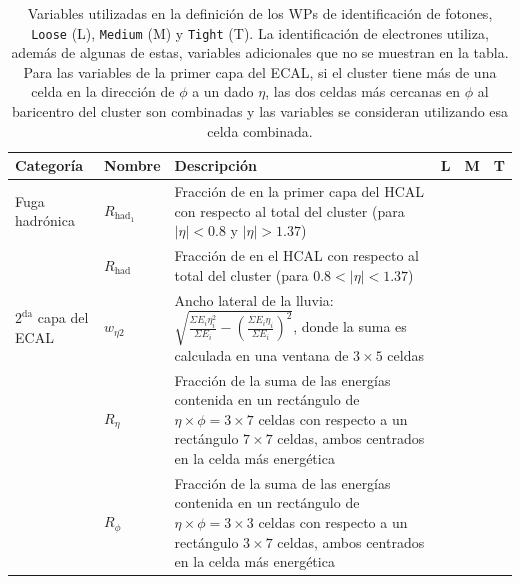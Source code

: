\begin{table}
\centering 
\caption{Variables utilizadas en la definición de los WPs de identificación de fotones, \texttt{Loose} (L), \texttt{Medium} (M) y \texttt{Tight} (T). La identificación de electrones utiliza, además de algunas de estas, variables adicionales que no se muestran en la tabla. Para las variables de la primer capa del ECAL, si el cluster tiene más de una celda en la dirección de $\phi$ a un dado $\eta$, las dos celdas más cercanas en $\phi$ al baricentro del cluster son combinadas y las variables se consideran utilizando esa celda combinada.}
	\begin{tabular}{ p{2.1cm} l p{8cm} c c c}

  \hline
  \hline

		Categoría & Nombre & Descripción & L & M & T \\

		\hline
		\hline

		Fuga hadrónica & $R_{\text{had}_{1}}$ & Fracción de \ET en la primer capa del HCAL con respecto al \ET total del cluster (para $|\eta|<0.8$ y $|\eta|>1.37$) & \cmark & \cmark & \cmark\\

		 & $R_{\text{had}}$ & Fracción de \ET en el HCAL con respecto al \ET total del cluster (para $0.8<|\eta|<1.37$) & \cmark & \cmark & \cmark \\

		\hline
		
		$2^{\text{da}}$ capa del ECAL   & $w_{\eta 2}$ & Ancho lateral de la lluvia: $\sqrt{\frac{\Sigma E_{i}\eta_{i}^{2}}{\Sigma E_{i}}-(\frac{\Sigma E_{i}\eta_{i}}{\Sigma E_{i}})^{2}}$, donde la suma es calculada en una ventana de $3\times5$ celdas & \cmark & \cmark & \cmark \\

		 & $R_{\eta}$ & Fracción de la suma de las energías contenida en un rectángulo de $\eta\times\phi = 3\times7$ celdas con respecto a un rectángulo $7\times7$ celdas, ambos centrados en la celda más energética & \cmark & \cmark & \cmark \\

		 & $R_{\phi}$ & Fracción de la suma de las energías contenida en un rectángulo de $\eta\times\phi = 3\times3$ celdas con respecto a un rectángulo $3\times7$ celdas, ambos centrados en la celda más energética & \xmark & \xmark & \cmark \\


\end{tabular}
\end{table}
